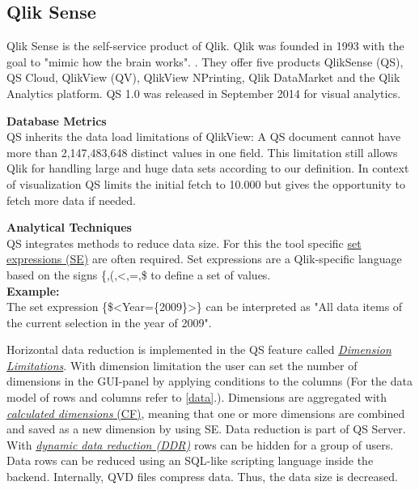 \subsection{Qlik Sense}\label{tool:QS}
Qlik Sense is the self-service product of Qlik. Qlik was founded in 1993 with the goal to "mimic how the brain works".  \cite{Qlik2017}. They offer five products QlikSense (QS), \gls{QS}   Cloud, QlikView (QV), QlikView NPrinting, Qlik DataMarket and the Qlik Analytics platform. \gls{QS}   1.0 was released in September 2014 for visual analytics. 
\par
\textbf{Database Metrics}\\
QS inherits the data load limitations of QlikView: A \gls{QS}   document cannot have more than 2,147,483,648 distinct values in one field. This limitation still allows Qlik for handling large and huge data sets according to our definition. In context of visualization QS limits the initial fetch to 10.000 but gives the opportunity to fetch more data if needed.
\par
\textbf{Analytical Techniques}\\
QS integrates methods to reduce data size. For this the tool specific \href{https://help.qlik.com/en-US/sense/3.2/Subsystems/Hub/Content/ChartFunctions/SetAnalysis/set-analysis-expressions.htm}{set expressions  (\gls{SE})} are often required. Set expressions are a Qlik-specific language based on the signs \{,(,<,=,\$ to define a set of values. \\
\textbf{Example:}\\
The set expression \{\$<Year=\{2009\}>\}  can be interpreted as "All data items of the current selection in the year of 2009".\par
Horizontal data reduction is implemented in the \gls{QS} feature called  \href{https://help.qlik.com/en-US/sense/3.2/Content/Videos/Videos-dimensions-limitations.htm}{\textit{Dimension Limitations}}. With dimension limitation the user can set the number of dimensions in the \gls{GUI}-panel by applying conditions to the columns (For the data model of rows and columns refer to \ref{data}.). 
Dimensions are aggregated with \href{https://help.qlik.com/en-US/sense/3.2/Subsystems/Hub/Content/Dimensions/calculated-dimensions.htm}{\textit{calculated dimensions} (\gls{CF})}, meaning that one or more dimensions are combined and saved as a new dimension by using \gls{SE}.
Data reduction is part of \gls{QS}   Server. With \href{https://help.qlik.com/en-US/sense/2.1/Subsystems/Hub/Content/Scripting/Security/dynamic-data-reduction.htm}{\textit{dynamic data reduction  (\gls{DDR})}} rows can be hidden for a group of users. Data rows can be reduced using an SQL-like scripting language inside the backend. Internally, QVD files compress data. Thus, the data size is decreased. 
